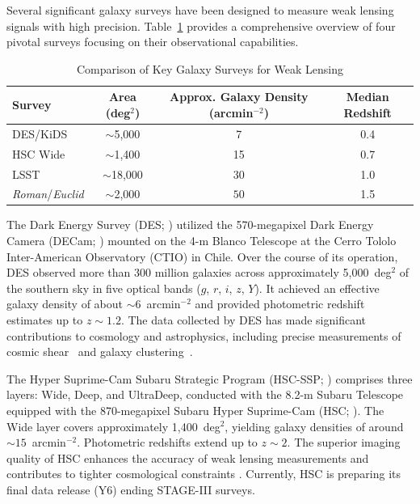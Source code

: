 Several significant galaxy surveys have been designed to measure weak lensing signals with high precision. Table~\ref{tab:survey_comparison} provides a comprehensive overview of four pivotal surveys focusing on their observational capabilities.
\begin{table}[h]
    \centering
    \caption{Comparison of Key Galaxy Surveys for Weak Lensing}
    \label{tab:survey_comparison}
    \begin{tabular}{lccc}
        \toprule
        \textbf{Survey} & \textbf{Area (deg$^2$)} & \textbf{Approx. Galaxy Density (arcmin$^{-2}$)} & \textbf{Median Redshift} \\
        \midrule
        DES/KiDS & $\sim$5,000 &  7 & 0.4 \\
        HSC Wide & $\sim$1,400 &  15 & 0.7 \\
        LSST & $\sim$18,000 & 30 & 1.0 \\
        \textit{Roman}/\textit{Euclid} & $\sim$2,000 & $50$ & 1.5 \\
        \bottomrule
    \end{tabular}
\end{table}

The Dark Energy Survey (DES; \citealt{2005astro.ph.10346T, 2018ApJS..239...18A, 2021ApJS..255...20A}) utilized the 570-megapixel Dark Energy Camera (DECam; \citealt{2015AJ....150..150F}) mounted on the 4-m Blanco Telescope at the Cerro Tololo Inter-American Observatory (CTIO) in Chile. Over the course of its operation, DES observed more than 300 million galaxies across approximately 5,000~deg$^2$ of the southern sky in five optical bands ($g$, $r$, $i$, $z$, $Y$). It achieved an effective galaxy density of about $\sim 6$~arcmin$^{-2}$ and provided photometric redshift estimates up to $z \sim 1.2$. The data collected by DES has made significant contributions to cosmology and astrophysics, including precise measurements of cosmic shear~\citep{2022PhRvD.105b3514A} and galaxy clustering~\citep{2022PhRvD.105b3520A}. 

The Hyper Suprime-Cam Subaru Strategic Program (HSC-SSP; \citealt{2018PASJ...70S...4A}) comprises three layers: Wide, Deep, and UltraDeep, conducted with the 8.2-m Subaru Telescope equipped with the 870-megapixel Subaru Hyper Suprime-Cam (HSC; \citealt{2018PASJ...70S...1M}). The Wide layer covers approximately 1,400~deg$^2$, yielding galaxy densities of around $\sim 15$~arcmin$^{-2}$. Photometric redshifts extend up to $z \sim 2$. The superior imaging quality of HSC enhances the accuracy of weak lensing measurements and contributes to tighter cosmological constraints \citep{2019PASJ...71...43H}. Currently, HSC is preparing its final data release (Y6) ending STAGE-III surveys.

